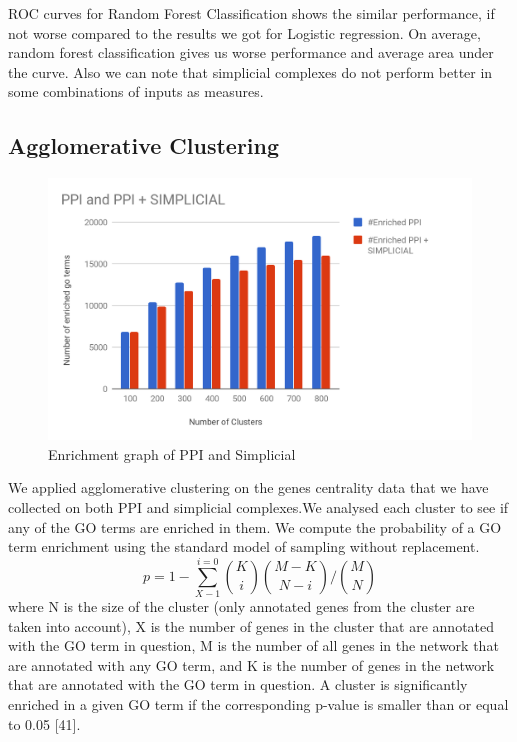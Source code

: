 \documentclass[9pt]{article}
\begin{document}
ROC curves for Random Forest Classification shows the similar performance, if not worse compared to the results we got for Logistic regression. On average, random forest classification gives us worse performance and average area under the curve. Also we can note that simplicial complexes do not perform better in some combinations of inputs as measures.

\subsection{Agglomerative Clustering}
\begin{figure}[!htb]
  \centering
  \includegraphics[width=\linewidth]{logisticRegressionGraphs/cluster.png}
\endminipage
\caption{Enrichment graph of PPI and Simplicial}
\end{figure}
We applied agglomerative clustering on the genes centrality data that we have collected on both PPI and simplicial complexes.We analysed each cluster to see if any of the GO terms are enriched in them. We compute the probability of a GO term enrichment using the standard model of sampling without replacement. 
\begin{equation}
p = 1 - \sum_{X-1}^{i=0}\binom{K}{i}\binom{M-K}{N-i}\bigg/\binom{M}{N}
\end{equation}
where N is the size of the cluster (only annotated genes from the cluster are taken into account), X is the number of genes in the cluster that are annotated with the GO term in question, M is the number of all genes in the network that are annotated with any GO term, and K is the number of genes in the network that are annotated with the GO term in question. A cluster is significantly enriched in a given GO term if the corresponding p-value is smaller than or equal to 0.05 [41].
\end{document}

